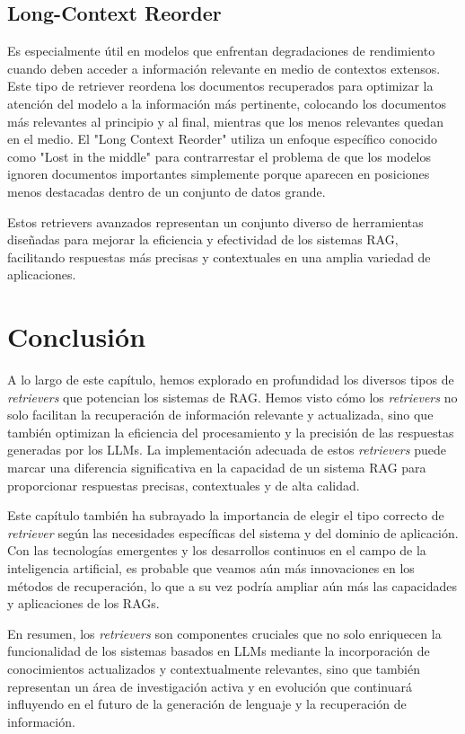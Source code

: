\subsection{Long-Context Reorder}

Es especialmente útil en modelos que enfrentan degradaciones de rendimiento cuando deben acceder a información relevante en medio de contextos extensos. Este tipo de retriever reordena los documentos recuperados para optimizar la atención del modelo a la información más pertinente, colocando los documentos más relevantes al principio y al final, mientras que los menos relevantes quedan en el medio.
El "Long Context Reorder" utiliza un enfoque específico conocido como "Lost in the middle" para contrarrestar el problema de que los modelos ignoren documentos importantes simplemente porque aparecen en posiciones menos destacadas dentro de un conjunto de datos grande. \citep{liu2023lost}

Estos retrievers avanzados representan un conjunto diverso de herramientas diseñadas para mejorar la eficiencia y efectividad de los sistemas RAG, facilitando respuestas más precisas y contextuales en una amplia variedad de aplicaciones.

\section{Conclusión}

A lo largo de este capítulo, hemos explorado en profundidad los diversos tipos de \textit{retrievers} que potencian los sistemas de RAG. Hemos visto cómo los \textit{retrievers} no solo facilitan la recuperación de información relevante y actualizada, sino que también optimizan la eficiencia del procesamiento y la precisión de las respuestas generadas por los LLMs. La implementación adecuada de estos \textit{retrievers} puede marcar una diferencia significativa en la capacidad de un sistema RAG para proporcionar respuestas precisas, contextuales y de alta calidad.

Este capítulo también ha subrayado la importancia de elegir el tipo correcto de \textit{retriever} según las necesidades específicas del sistema y del dominio de aplicación. Con las tecnologías emergentes y los desarrollos continuos en el campo de la inteligencia artificial, es probable que veamos aún más innovaciones en los métodos de recuperación, lo que a su vez podría ampliar aún más las capacidades y aplicaciones de los RAGs.

En resumen, los \textit{retrievers} son componentes cruciales que no solo enriquecen la funcionalidad de los sistemas basados en LLMs mediante la incorporación de conocimientos actualizados y contextualmente relevantes, sino que también representan un área de investigación activa y en evolución que continuará influyendo en el futuro de la generación de lenguaje y la recuperación de información.





